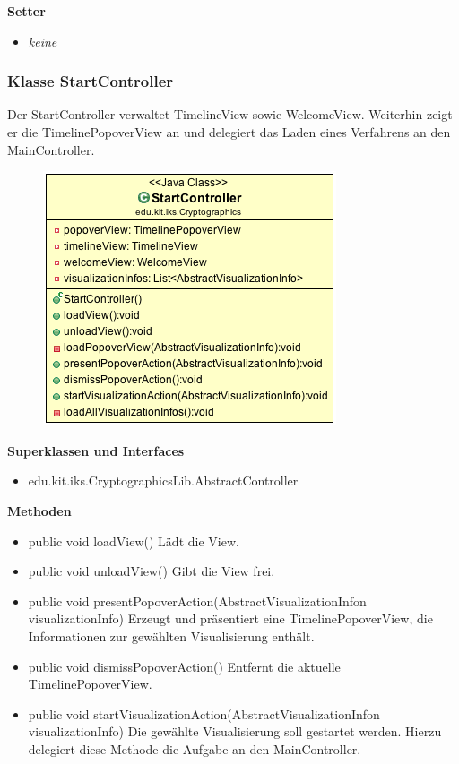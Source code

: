 \documentclass{article}
\begin{document}
      \textbf{Setter}
      \begin{itemize}
        \item \textit{keine}
      \end{itemize}

    \subsubsection{Klasse StartController}
      Der StartController verwaltet TimelineView sowie WelcomeView. Weiterhin zeigt er die TimelinePopoverView an und delegiert das Laden eines Verfahrens an den MainController.
      \begin{figure}[H]
        \centering
        \includegraphics{resources/edu-kit-iks-Cryptographics-StartController}
      \end{figure}

      \textbf{Superklassen und Interfaces}
      \begin{itemize}
        \item edu.kit.iks.CryptographicsLib.AbstractController
      \end{itemize}
      
      \textbf{Methoden}
      \begin{itemize}
        \item public void loadView() \newline
        Lädt die View.
        \item public void unloadView() \newline
        Gibt die View frei.
        \item public void presentPopoverAction(AbstractVisualizationInfon visualizationInfo) \newline
        Erzeugt und präsentiert eine TimelinePopoverView, die Informationen zur gewählten Visualisierung enthält.
        \item public void dismissPopoverAction() \newline
        Entfernt die aktuelle TimelinePopoverView.
        \item public void startVisualizationAction(AbstractVisualizationInfon visualizationInfo) \newline
        Die gewählte Visualisierung soll gestartet werden. Hierzu delegiert diese Methode die Aufgabe an den MainController.
      \end{itemize}
\end{document}
